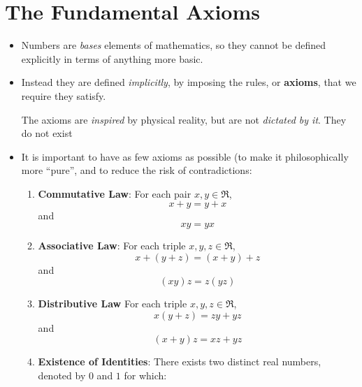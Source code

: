\section{The Fundamental Axioms}
\begin{itemize}
    \item Numbers are \textit{bases} elements of mathematics, so they cannot be defined explicitly in terms of anything more basic. \item Instead they are defined \textit{implicitly}, by imposing the rules, or \textbf{axioms}, that we require they satisfy.
    \begin{idea}
        The axioms are \textit{inspired} by physical reality, but are not \textit{dictated by it}. They do not exist
    \end{idea}
    \item It is important to have as few axioms as possible (to make it philosophically more ``pure'', and to reduce the risk of contradictions:
    \begin{enumerate}
        \item \textbf{Commutative Law}: For each pair $x,y\in \Re$,
        \begin{equation}
            x+y=y+x
            \label{eq:}
        \end{equation}
        and
        \begin{equation}
            xy=yx
            \label{eq:}
        \end{equation}
        \item \textbf{Associative Law}: For each triple $x,y,z \in\Re$,
        \begin{equation}
            x+(y+z)=(x+y)+z
            \label{eq:}
        \end{equation}
        and
        \begin{equation}
            (xy)z=z(yz)
            \label{eq:}
        \end{equation}
        \item \textbf{Distributive Law} For each triple $x,y,z \in \Re$,
        \begin{equation}
            x(y+z)=zy+yz
            \label{eq:}
        \end{equation}
        and
        \begin{equation}
            (x+y)z=xz+yz
            \label{eq:}
        \end{equation}
        \item \textbf{Existence of Identities}: There exists two distinct real numbers, denoted by $0$ and $1$ for which:

\end{enumerate}
\end{itemize}
